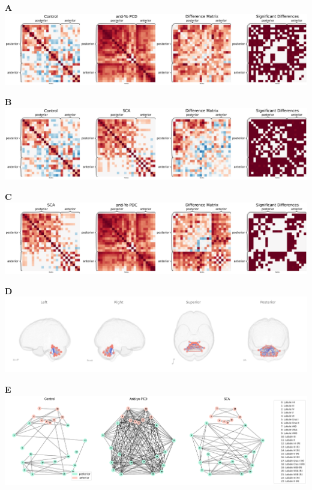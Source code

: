 \documentclass{standalone}
\begin{document}
\centering
\begin{minipage}[t]{0.8\textwidth}
    \textbf{A}\\[4pt]
    \includegraphics[width=\textwidth]{graphics/Combined_Adjacency_Matrices_with_Significance_12.png}
\end{minipage}
\begin{minipage}[t]{0.8\textwidth}
    \textbf{B}\\[4pt]
    \includegraphics[width=\textwidth]{graphics/Combined_Adjacency_Matrices_with_Significance_13.png}
\end{minipage}
\begin{minipage}[t]{0.8\textwidth}
    \textbf{C}\\[4pt]
    \includegraphics[width=\textwidth]{graphics/Combined_Adjacency_Matrices_with_Significance_23.png}
\end{minipage}
    \begin{minipage}[t]{0.8\textwidth}
    \textbf{D}\\[4pt]
    \includegraphics[width=\textwidth]{graphics/antiYoPCD_Network_Brain.png}
\end{minipage}
    \begin{minipage}[t]{0.8\textwidth}
    \textbf{E}\\[4pt]
    \includegraphics[width=\textwidth]{graphics/network.png}
\end{minipage}
\end{document}
